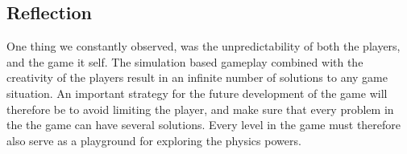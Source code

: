 \subsection{Reflection} %
One thing we constantly observed, was the unpredictability of both the players, and the game it self. The simulation based gameplay combined with the creativity of the players result in an infinite number of solutions to any game situation. An important strategy for the future development of the game will therefore be to avoid limiting the player, and make sure that every problem in the the game can have several solutions. Every level in the game must therefore also serve as a playground for exploring the physics powers.